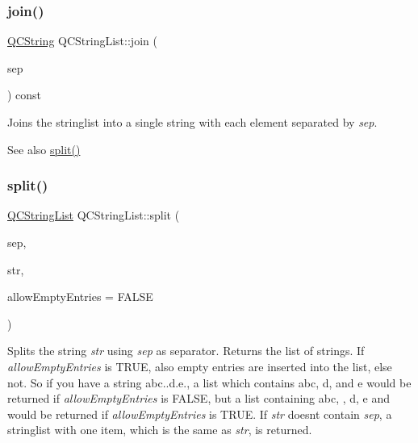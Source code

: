 \subsubsection{\texorpdfstring{join()}{join()}}
{\footnotesize\ttfamily \mbox{\hyperlink{class_q_c_string}{Q\+C\+String}} Q\+C\+String\+List\+::join (\begin{DoxyParamCaption}\item[{const \mbox{\hyperlink{class_q_c_string}{Q\+C\+String}} \&}]{sep }\end{DoxyParamCaption}) const}

Joins the stringlist into a single string with each element separated by {\itshape sep}.

\begin{DoxySeeAlso}{See also}
\mbox{\hyperlink{class_q_c_string_list_ae46355a1739a9545bdc3ab9e37c83758}{split()}} 
\end{DoxySeeAlso}
\mbox{\label{class_q_c_string_list_a5e1404c397195e19b31dd31acd6da698}} 
\subsubsection{\texorpdfstring{split()}{split()}\hspace{0.1cm}{\footnotesize\ttfamily [1/3]}}
{\footnotesize\ttfamily \mbox{\hyperlink{class_q_c_string_list}{Q\+C\+String\+List}} Q\+C\+String\+List\+::split (\begin{DoxyParamCaption}\item[{char}]{sep,  }\item[{const \mbox{\hyperlink{class_q_c_string}{Q\+C\+String}} \&}]{str,  }\item[{bool}]{allow\+Empty\+Entries = {\ttfamily FALSE} }\end{DoxyParamCaption})\hspace{0.3cm}{\ttfamily [static]}}

Splits the string {\itshape str} using {\itshape sep} as separator. Returns the list of strings. If {\itshape allow\+Empty\+Entries} is T\+R\+UE, also empty entries are inserted into the list, else not. So if you have a string \textquotesingle{}abc..d.\+e.\textquotesingle{}, a list which contains \textquotesingle{}abc\textquotesingle{}, \textquotesingle{}d\textquotesingle{}, and \textquotesingle{}e\textquotesingle{} would be returned if {\itshape allow\+Empty\+Entries} is F\+A\+L\+SE, but a list containing \textquotesingle{}abc\textquotesingle{}, \textquotesingle{}\textquotesingle{}, \textquotesingle{}d\textquotesingle{}, \textquotesingle{}e\textquotesingle{} and \textquotesingle{}\textquotesingle{} would be returned if {\itshape allow\+Empty\+Entries} is T\+R\+UE. If {\itshape str} doesn\textquotesingle{}t contain {\itshape sep}, a stringlist with one item, which is the same as {\itshape str}, is returned.

